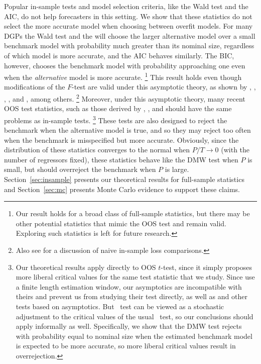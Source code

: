 \documentclass[12pt]{article}
\begin{document}
Popular in-sample tests and model selection criteria, like the Wald
test and the AIC, do not help forecasters in this setting. We show
that these statistics do not select the more accurate model when
choosing between overfit models. For many DGPs the Wald test and the
will choose the larger alternative model over a small benchmark model
with probability much greater than its nominal size, regardless of
which model is more accurate, and the AIC behaves similarly. The BIC,
however, chooses the benchmark model with probability approaching one
even when the \emph{alternative} model is more accurate.%
\footnote{Our result holds for a broad class of full-sample
  statistics, but there may be other potential statistics that mimic
  the OOS test and remain valid. Exploring such statistics is left for
  future research.} %
This result holds even though modifications of the $F$-test are valid
under this asymptotic theory, as shown by \citet{BoB:95},
\citet{AkA:00}, \citet{AkP:04}, \citet{Cal:11c}, and \citet{Ana:12},
among others.%
\footnote{Also see \citet{Efr:86,Efr:04} for a discussion of naive
  in-sample loss comparisons.} %
Moreover, under this asymptotic theory, many recent OOS test
statistics, such as those derived by \cite{ClM:01,ClM:05},
\citet{Mcc:07}, and \citet{ClW:06,ClW:07} should have the same
problems as in-sample tests.%
\footnote{Our theoretical results apply directly to 
  OOS $t$-test, since it simply proposes more liberal critical values
  for the same test statistic that we study.  Since
  \citet{ClW:06,ClW:07} use a finite length estimation window, our
  asymptotics are incompatible with theirs and prevent us from
  studying their test directly, as well as  and other
  tests based on  asymptotics.  But \clws\ test can be
  viewed as a stochastic adjustment to the critical values of the
  usual \oost\ test, so our conclusions should apply informally as
  well.  Specifically, we show that the DMW test rejects with
  probability equal to nominal size when the estimated benchmark model
  is expected to be more accurate, so more liberal critical values
  result in overrejection.} %
These tests are also designed to reject the benchmark when the
alternative model is true, and so they may reject too often when the
benchmark is misspecified but more accurate.  Obviously, since the
distribution of these statistics converges to the normal when $P/T \to
0$ (with the number of regressors fixed), these statistics behave like
the DMW test when $P$ is small, but should overreject the benchmark
when $P$ is large. Section~\ref{sec:insample} presents our theoretical
results for full-sample statistics and Section~\ref{sec:mc} presents
Monte Carlo evidence to support these claims.
\end{document}

